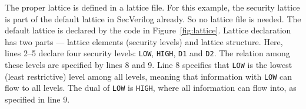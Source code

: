 \documentclass [12pt, oneside, a4paper]{article}
\newcommand{\code}[1]{\texttt{#1}}
\begin{document}
{%

The proper lattice is defined in a lattice file. For this example, the
security lattice is part of the default lattice in SecVerilog already. So no
lattice file is needed.
The default lattice is declared by the code in Figure~\ref{fig:lattice}.
Lattice declaration has two parts --- lattice elements (security levels) and
lattice structure. Here, lines 2--5 declare four security levels:
\code{LOW}, \code{HIGH}, \code{D1} and \code{D2}. The relation among these
levels are specified by lines 8 and 9. Line 8 specifies that \code{LOW} is the
lowest (least restrictive) level among all levels, meaning that information
with \code{LOW} can flow to all levels. The dual of \code{LOW} is \code{HIGH},
where all information can flow into, as specified in line 9.

}
\end{document}
